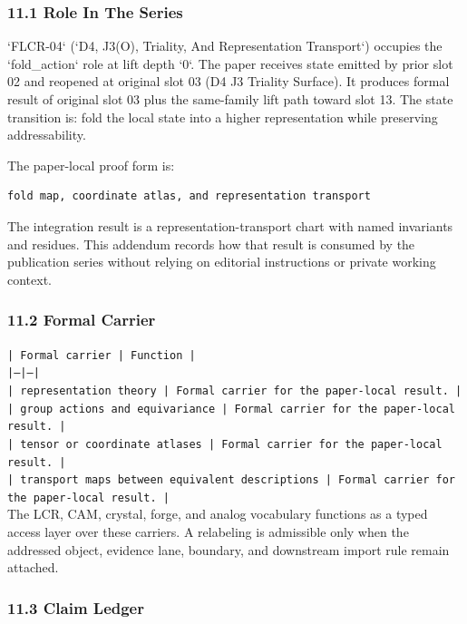 \documentclass[11pt]{article}
\begin{document}
\subsubsection*{11.1 Role In The Series}

`FLCR-04` (`D4, J3(O), Triality, And Representation Transport`) occupies the `fold\_action` role at lift depth `0`.
The paper receives state emitted by prior slot 02 and reopened at original slot 03 (D4 J3 Triality Surface). It produces formal result of original slot 03 plus the same-family lift path toward slot 13. The state transition is:
fold the local state into a higher representation while preserving addressability.

The paper-local proof form is:

\begin{verbatim}
fold map, coordinate atlas, and representation transport
\end{verbatim}

The integration result is a representation-transport chart with named invariants and residues. This addendum records how that result is
consumed by the publication series without relying on editorial instructions or
private working context.

\subsubsection*{11.2 Formal Carrier}

\noindent\texttt{| Formal carrier | Function |}\\
\noindent\texttt{|---|---|}\\
\noindent\texttt{| representation theory | Formal carrier for the paper-local result. |}\\
\noindent\texttt{| group actions and equivariance | Formal carrier for the paper-local result. |}\\
\noindent\texttt{| tensor or coordinate atlases | Formal carrier for the paper-local result. |}\\
\noindent\texttt{| transport maps between equivalent descriptions | Formal carrier for the paper-local result. |}\\

The LCR, CAM, crystal, forge, and analog vocabulary functions as a typed access
layer over these carriers. A relabeling is admissible only when the addressed
object, evidence lane, boundary, and downstream import rule remain attached.

\subsubsection*{11.3 Claim Ledger}
\end{document}
